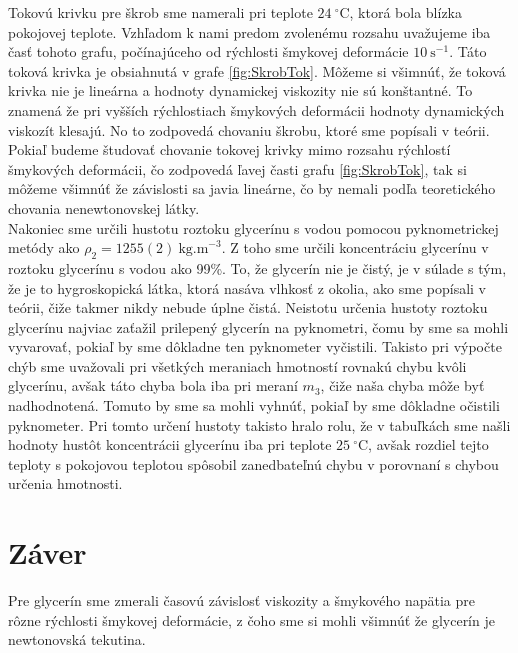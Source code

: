 \documentclass{prepareprotokol} %
\begin{document}
Tokovú krivku pre škrob sme namerali pri teplote $24~^\circ \mathrm{C}$, ktorá bola blízka pokojovej teplote. 
Vzhľadom k nami predom zvolenému rozsahu uvažujeme iba časť tohoto grafu, počínajúceho od rýchlosti šmykovej deformácie $10~\mathrm{s}^{-1}$. 
Táto toková krivka je obsiahnutá v grafe \ref{fig:SkrobTok}. 
Môžeme si všimnúť, že toková krivka nie je lineárna a hodnoty dynamickej viskozity nie sú konštantné. To znamená že pri vyšších rýchlostiach šmykových deformácii hodnoty dynamických viskozít klesajú. 
No to zodpovedá chovaniu škrobu, ktoré sme popísali v teórii.\\

Pokiaľ budeme študovať chovanie tokovej krivky mimo rozsahu rýchlostí šmykových deformácii, čo zodpovedá ľavej časti grafu \ref{fig:SkrobTok}, tak si môžeme všimnúť že závislosti sa javia lineárne, čo by nemali podľa teoretického chovania nenewtonovskej látky.\\

Nakoniec sme určili hustotu roztoku glycerínu s vodou pomocou pyknometrickej metódy ako $\rho_2 = 1255(2)~\mathrm{kg.m}^{-3}$. 
Z toho sme určili koncentráciu glycerínu v roztoku glycerínu s vodou ako 99\%. 
To, že glycerín nie je čistý, je v súlade s tým, že je to hygroskopická látka, ktorá nasáva vlhkosť z okolia, ako sme popísali v teórii, čiže takmer nikdy nebude úplne čistá. 
Neistotu určenia hustoty roztoku glycerínu najviac zaťažil prilepený glycerín na pyknometri, čomu by sme sa mohli vyvarovať, pokiaľ by sme dôkladne ten pyknometer vyčistili. 
Takisto pri výpočte chýb sme uvažovali pri všetkých meraniach hmotností rovnakú chybu kvôli glycerínu, avšak táto chyba bola iba pri meraní $m_3$, čiže naša chyba môže byť nadhodnotená. 
Tomuto by sme sa mohli vyhnúť, pokiaľ by sme dôkladne očistili pyknometer. 
Pri tomto určení hustoty takisto hralo rolu, že v tabuľkách sme našli hodnoty hustôt koncentrácii glycerínu iba pri teplote $25~^\circ \mathrm{C}$, avšak rozdiel tejto teploty s pokojovou teplotou spôsobil zanedbateľnú chybu v porovnaní s chybou určenia hmotnosti.

\section*{Záver}

Pre glycerín sme zmerali časovú závislosť viskozity a šmykového napätia pre rôzne rýchlosti šmykovej deformácie, z čoho sme si mohli všimnúť že glycerín je newtonovská tekutina.\\
\end{document}
